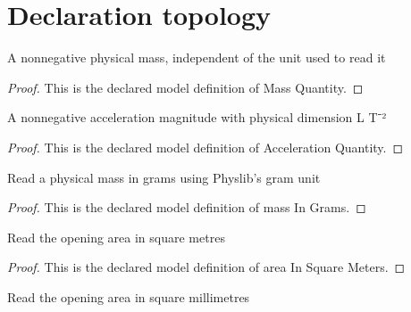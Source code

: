 \section{Declaration topology}
\begin{definition}
  \label{def:physics:phyx-mini-0398:phyxminiproblems-problemphyxmini0398-massquantity}
  A nonnegative physical mass, independent of the unit used to read it
\end{definition}
\begin{proof}
  This is the declared model definition of Mass Quantity.
\end{proof}
\begin{definition}
  \label{def:physics:phyx-mini-0398:phyxminiproblems-problemphyxmini0398-accelerationquantity}
  A nonnegative acceleration magnitude with physical dimension L T⁻²
\end{definition}
\begin{proof}
  This is the declared model definition of Acceleration Quantity.
\end{proof}
\begin{definition}
  \label{def:physics:phyx-mini-0398:phyxminiproblems-problemphyxmini0398-massingrams}
  Read a physical mass in grams using Physlib's gram unit
\end{definition}
\begin{proof}
  This is the declared model definition of mass In Grams.
\end{proof}
\begin{definition}
  \label{def:physics:phyx-mini-0398:phyxminiproblems-problemphyxmini0398-areainsquaremeters}
  Read the opening area in square metres
\end{definition}
\begin{proof}
  This is the declared model definition of area In Square Meters.
\end{proof}
\begin{definition}
  \label{def:physics:phyx-mini-0398:phyxminiproblems-problemphyxmini0398-areainsquaremillimeters}
  Read the opening area in square millimetres
\end{definition}
